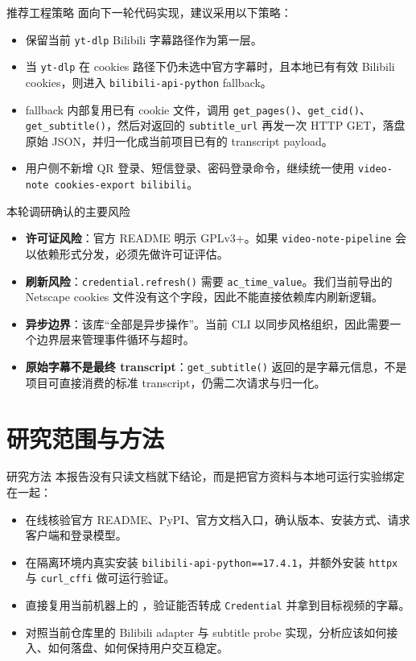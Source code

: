\documentclass[a4paper]{article}
\begin{document}
\begin{findingbox}{推荐工程策略}
面向下一轮代码实现，建议采用以下策略：
\begin{itemize}
\item 保留当前 \texttt{yt-dlp} Bilibili 字幕路径作为第一层。
\item 当 \texttt{yt-dlp} 在 cookies 路径下仍未选中官方字幕时，且本地已有有效 Bilibili cookies，则进入 \texttt{bilibili-api-python} fallback。
\item fallback 内部复用已有 cookie 文件，调用 \texttt{get\_pages()}、\texttt{get\_cid()}、\texttt{get\_subtitle()}，然后对返回的 \texttt{subtitle\_url} 再发一次 HTTP GET，落盘原始 JSON，并归一化成当前项目已有的 transcript payload。
\item 用户侧不新增 QR 登录、短信登录、密码登录命令，继续统一使用 \texttt{video-note cookies-export bilibili}。
\end{itemize}
\end{findingbox}

\begin{riskbox}{本轮调研确认的主要风险}
\begin{itemize}
\item \textbf{许可证风险}：官方 README 明示 GPLv3+。如果 \texttt{video-note-pipeline} 会以依赖形式分发，必须先做许可证评估。
\item \textbf{刷新风险}：\texttt{credential.refresh()} 需要 \texttt{ac\_time\_value}。我们当前导出的 Netscape cookies 文件没有这个字段，因此不能直接依赖库内刷新逻辑。
\item \textbf{异步边界}：该库“全部是异步操作”。当前 CLI 以同步风格组织，因此需要一个边界层来管理事件循环与超时。
\item \textbf{原始字幕不是最终 transcript}：\texttt{get\_subtitle()} 返回的是字幕元信息，不是项目可直接消费的标准 transcript，仍需二次请求与归一化。
\end{itemize}
\end{riskbox}

\section{研究范围与方法}

\begin{methodbox}{研究方法}
本报告没有只读文档就下结论，而是把官方资料与本地可运行实验绑定在一起：
\begin{itemize}
\item 在线核验官方 README、PyPI、官方文档入口，确认版本、安装方式、请求客户端和登录模型。
\item 在隔离环境内真实安装 \texttt{bilibili-api-python==17.4.1}，并额外安装 \texttt{httpx} 与 \texttt{curl\_cffi} 做可运行验证。
\item 直接复用当前机器上的 ，验证能否转成 \texttt{Credential} 并拿到目标视频的字幕。
\item 对照当前仓库里的 Bilibili adapter 与 subtitle probe 实现，分析应该如何接入、如何落盘、如何保持用户交互稳定。
\end{itemize}
\end{methodbox}
\end{document}
